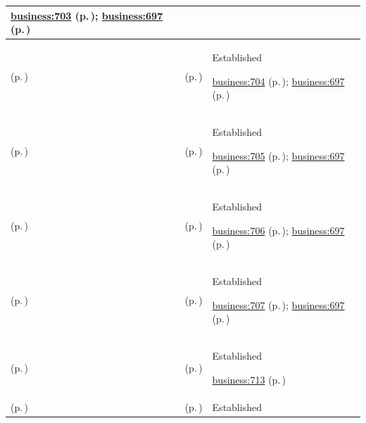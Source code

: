 \begin{longtable}{|>{\raggedright\arraybackslash}p{0.27\TableWidth}|>{\raggedright\arraybackslash}p{0.27\TableWidth}|>{\raggedright\arraybackslash}p{0.46\TableWidth}|}
 \hyperref[rad:business:699]{business:703} (p.\,\pageref{rad:business:699}); \hyperref[rad:business:697]{business:697} (p.\,\pageref{rad:business:697})\\\hline
\nameref{cap:bc-health-information-standards-governance} (p.\,\pageref{cap:bc-health-information-standards-governance}) & \nameref{cap:bc-information-model-compliance} (p.\,\pageref{cap:bc-information-model-compliance}) & Established

 \hyperref[rad:business:699]{business:704} (p.\,\pageref{rad:business:699}); \hyperref[rad:business:697]{business:697} (p.\,\pageref{rad:business:697})\\\hline
\nameref{cap:bc-health-information-standards-governance} (p.\,\pageref{cap:bc-health-information-standards-governance}) & \nameref{cap:bc-information-model-governance-oversight} (p.\,\pageref{cap:bc-information-model-governance-oversight}) & Established

 \hyperref[rad:business:699]{business:705} (p.\,\pageref{rad:business:699}); \hyperref[rad:business:697]{business:697} (p.\,\pageref{rad:business:697})\\\hline
\nameref{cap:bc-health-information-standards-governance} (p.\,\pageref{cap:bc-health-information-standards-governance}) & \nameref{cap:bc-standards-adoption} (p.\,\pageref{cap:bc-standards-adoption}) & Established

 \hyperref[rad:business:699]{business:706} (p.\,\pageref{rad:business:699}); \hyperref[rad:business:697]{business:697} (p.\,\pageref{rad:business:697})\\\hline
\nameref{cap:bc-health-information-standards-governance} (p.\,\pageref{cap:bc-health-information-standards-governance}) & \nameref{cap:bc-standards-impact-identification} (p.\,\pageref{cap:bc-standards-impact-identification}) & Established

 \hyperref[rad:business:699]{business:707} (p.\,\pageref{rad:business:699}); \hyperref[rad:business:697]{business:697} (p.\,\pageref{rad:business:697})\\\hline
\nameref{cap:bc-standards-semantics-reference-governance} (p.\,\pageref{cap:bc-standards-semantics-reference-governance}) & \nameref{cap:bc-clinical-semantics-governance} (p.\,\pageref{cap:bc-clinical-semantics-governance}) & Established

 \hyperref[rad:business:713]{business:713} (p.\,\pageref{rad:business:713})\\\hline
\nameref{cap:bc-clinical-semantics-governance} (p.\,\pageref{cap:bc-clinical-semantics-governance}) & \nameref{cap:bc-terminology-governance} (p.\,\pageref{cap:bc-terminology-governance}) & Established


\end{longtable}
